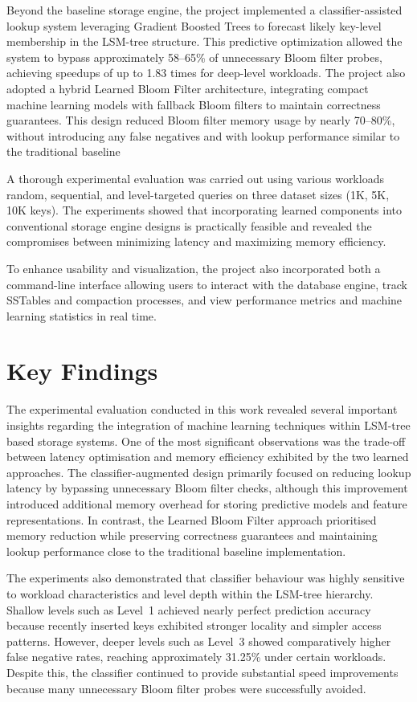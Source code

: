 \documentclass{mnitjaipur}
\begin{document}
Beyond the baseline storage engine, the project implemented a classifier-assisted lookup system leveraging Gradient Boosted Trees to forecast likely key-level membership in the LSM-tree structure. This predictive optimization allowed the system to bypass approximately 58--65\% of unnecessary Bloom filter probes, achieving speedups of up to 1.83 times for deep-level workloads. The project also adopted a hybrid Learned Bloom Filter architecture, integrating compact machine learning models with fallback Bloom filters to maintain correctness guarantees. This design reduced Bloom filter memory usage by nearly 70--80\%, without introducing any false negatives and with lookup performance similar to the traditional baseline

A thorough experimental evaluation was carried out using various workloads random, sequential, and level-targeted queries on three dataset sizes (1K, 5K, 10K keys). The experiments showed that incorporating learned components into conventional storage engine designs is practically feasible and revealed the compromises between minimizing latency and maximizing memory efficiency. 

To enhance usability and visualization, the project also incorporated both a command-line interface allowing users to interact with the database engine, track SSTables and compaction processes, and view performance metrics and machine learning statistics in real time. 

\section{Key Findings}

The experimental evaluation conducted in this work revealed several important insights regarding the integration of machine learning techniques within LSM-tree based storage systems. One of the most significant observations was the trade-off between latency optimisation and memory efficiency exhibited by the two learned approaches. The classifier-augmented design primarily focused on reducing lookup latency by bypassing unnecessary Bloom filter checks, although this improvement introduced additional memory overhead for storing predictive models and feature representations. In contrast, the Learned Bloom Filter approach prioritised memory reduction while preserving correctness guarantees and maintaining lookup performance close to the traditional baseline implementation.

The experiments also demonstrated that classifier behaviour was highly sensitive to workload characteristics and level depth within the LSM-tree hierarchy. Shallow levels such as Level~1 achieved nearly perfect prediction accuracy because recently inserted keys exhibited stronger locality and simpler access patterns. However, deeper levels such as Level~3 showed comparatively higher false negative rates, reaching approximately 31.25\% under certain workloads. Despite this, the classifier continued to provide substantial speed improvements because many unnecessary Bloom filter probes were successfully avoided.
\end{document}
